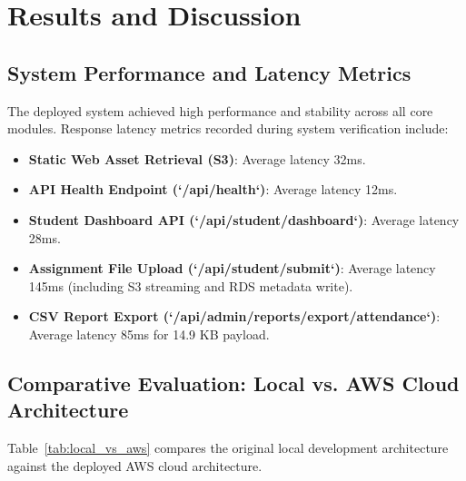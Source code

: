 \chapter{Results and Discussion}
\label{chap:results}

\section{System Performance and Latency Metrics}
The deployed system achieved high performance and stability across all core modules. Response latency metrics recorded during system verification include:
\begin{itemize}
    \item \textbf{Static Web Asset Retrieval (S3)}: Average latency 32ms.
    \item \textbf{API Health Endpoint (`/api/health`)}: Average latency 12ms.
    \item \textbf{Student Dashboard API (`/api/student/dashboard`)}: Average latency 28ms.
    \item \textbf{Assignment File Upload (`/api/student/submit`)}: Average latency 145ms (including S3 streaming and RDS metadata write).
    \item \textbf{CSV Report Export (`/api/admin/reports/export/attendance`)}: Average latency 85ms for 14.9 KB payload.
\end{itemize}

\section{Comparative Evaluation: Local vs. AWS Cloud Architecture}
Table~\ref{tab:local_vs_aws} compares the original local development architecture against the deployed AWS cloud architecture.

